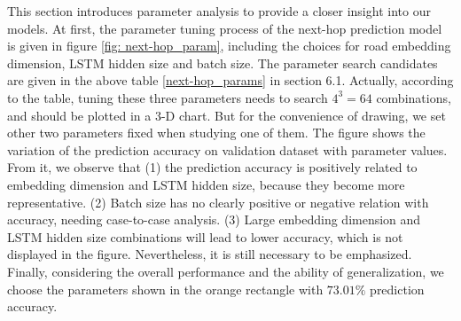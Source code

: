 This section introduces parameter analysis to provide a closer insight into our models. At first, the parameter tuning process of the next-hop prediction model is given in figure \ref{fig: next-hop_param}, including the choices for road embedding dimension, LSTM hidden size and batch size. The parameter search candidates are given in the above table \ref{next-hop_params} in section 6.1. Actually, according to the table, tuning these three parameters needs to search $4^3=64$ combinations, and should be plotted in a 3-D chart. But for the convenience of drawing, we set other two parameters fixed when studying one of them. The figure shows the variation of the prediction accuracy on validation dataset with parameter values. From it, we observe that (1) the prediction accuracy is positively related to embedding dimension and LSTM hidden size, because they become more representative. (2) Batch size has no clearly positive or negative relation with accuracy, needing case-to-case analysis. (3) Large embedding dimension and LSTM hidden size combinations will lead to lower accuracy, which is not displayed in the figure. Nevertheless, it is still necessary to be emphasized. Finally, considering the overall performance and the ability of generalization, we choose the parameters shown in the orange rectangle with $73.01\%$ prediction accuracy.

